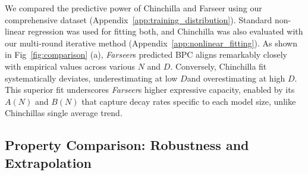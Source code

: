 \documentclass{article}
\begin{document}

We compared the predictive power of Chinchilla and Farseer using our comprehensive dataset (Appendix~\ref{app:training_distribution}). Standard non-linear regression was used for fitting both, and Chinchilla was also evaluated with our multi-round iterative method (Appendix~\ref{app:nonlinear_fitting}). As shown in Fig~\ref{fig:comparison} (a), \textit{Farseer}s predicted BPC aligns remarkably closely with empirical values across various $N$ and $D$.
Conversely, Chinchilla fit systematically deviates, underestimating at low $D $and overestimating at high $D$. This superior fit underscores \textit{Farseer}s higher expressive capacity, enabled by its $A(N)$ and $B(N)$ that capture decay rates specific to each model size, unlike Chinchillas single average trend.

\subsection{Property Comparison: Robustness and Extrapolation}
\end{document}
